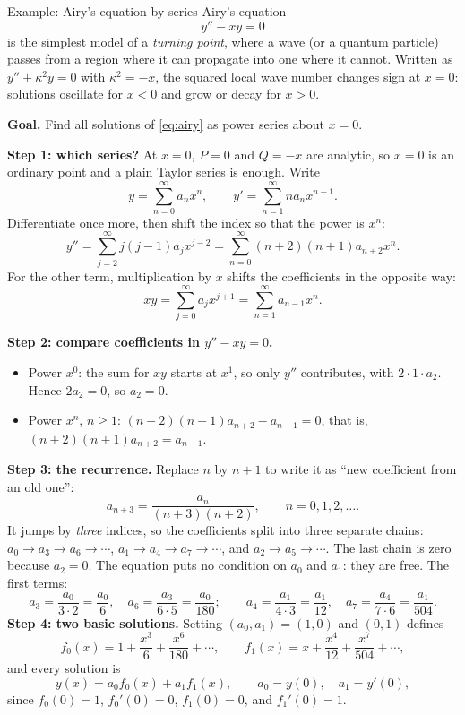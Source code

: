 \documentclass[11pt]{beamer}
\begin{document}
\begin{frame}[allowframebreaks=1.00]{Example: Airy's equation by series}
\footnotesize
Airy's equation
\begin{equation}
 y''-xy=0\label{eq:airy}
\end{equation}
is the simplest model of a \emph{turning point}, where a wave (or a quantum particle)
passes from a region where it can propagate into one where it cannot.  Written as
$y''+\kappa^2y=0$ with $\kappa^2=-x$, the squared local wave number changes sign at $x=0$:
solutions oscillate for $x<0$ and grow or decay for $x>0$.

\textbf{Goal.} Find all solutions of \eqref{eq:airy} as power series about \(x=0\).

\textbf{Step 1: which series?} At \(x=0\), \(P=0\) and \(Q=-x\) are analytic, so \(x=0\) is an ordinary
point and a plain Taylor series is enough. Write
\[
 y=\sum_{n=0}^{\infty}a_nx^n,\qquad
 y'=\sum_{n=1}^{\infty}na_nx^{n-1}.
\]
Differentiate once more, then shift the index so that the power is $x^n$:
\[
 y''=\sum_{j=2}^{\infty}j(j-1)a_jx^{j-2}
     =\sum_{n=0}^{\infty}(n+2)(n+1)a_{n+2}x^n.
\]
For the other term, multiplication by $x$ shifts the coefficients in the opposite way:
\[
 xy=\sum_{j=0}^{\infty}a_jx^{j+1}
    =\sum_{n=1}^{\infty}a_{n-1}x^n.
\]


\textbf{Step 2: compare coefficients in \(y''-xy=0\).}
\begin{itemize}
  \item Power \(x^0\): the sum for \(xy\) starts at \(x^1\), so only \(y''\) contributes, with
        \(2\cdot1\cdot a_2\). Hence \(2a_2=0\), so \(a_2=0\).
  \item Power \(x^n\), \(n\ge1\): \((n+2)(n+1)a_{n+2}-a_{n-1}=0\), that is, \((n+2)(n+1)a_{n+2}=a_{n-1}\).
\end{itemize}
\textbf{Step 3: the recurrence.} Replace \(n\) by \(n+1\) to write it as ``new coefficient from an old one'':
\begin{equation}
 a_{n+3}=\frac{a_n}{(n+3)(n+2)},\qquad n=0,1,2,\ldots.
 \label{eq:airy-rec}
\end{equation}
It jumps by \emph{three} indices, so the coefficients split into three separate chains:
\(a_0\to a_3\to a_6\to\cdots\), \(a_1\to a_4\to a_7\to\cdots\), and \(a_2\to a_5\to\cdots\). The last chain is zero
because \(a_2=0\). The equation puts no condition on \(a_0\) and \(a_1\): they are free. The first terms:
\[
 a_3=\frac{a_0}{3\cdot2}=\frac{a_0}{6},\quad
 a_6=\frac{a_3}{6\cdot5}=\frac{a_0}{180};
 \qquad
 a_4=\frac{a_1}{4\cdot3}=\frac{a_1}{12},\quad
 a_7=\frac{a_4}{7\cdot6}=\frac{a_1}{504}.
\]
\textbf{Step 4: two basic solutions.} Setting \((a_0,a_1)=(1,0)\) and \((0,1)\) defines
\[
 f_0(x)=1+\frac{x^3}{6}+\frac{x^6}{180}+\cdots,
 \qquad
 f_1(x)=x+\frac{x^4}{12}+\frac{x^7}{504}+\cdots,
\]
and every solution is
\begin{equation}
 y(x)=a_0f_0(x)+a_1f_1(x),\qquad a_0=y(0),\quad a_1=y'(0),
 \label{eq:airy-series}
\end{equation}
since $f_0(0)=1$, $f_0'(0)=0$, $f_1(0)=0$, and $f_1'(0)=1$.
\end{frame}
\end{document}
